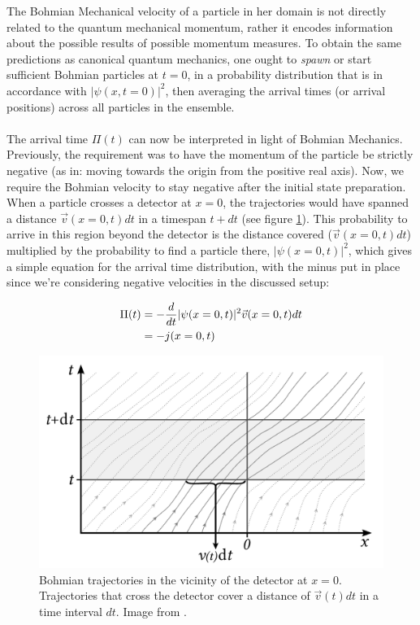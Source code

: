 The Bohmian Mechanical velocity of a particle in her domain is not directly related to the quantum mechanical momentum, rather it encodes information about the possible results of possible momentum measures. To obtain the same predictions as canonical quantum mechanics, one ought to \textit{spawn} or start sufficient Bohmian particles at $t=0$, in a probability distribution that is in accordance with $|\psi(x,t=0)|^2$, then averaging the arrival times (or arrival positions) across all particles in the ensemble.
\\\\
The arrival time $\Pi(t)$ can now be interpreted in light of Bohmian Mechanics. Previously, the requirement was to have the momentum of the particle be strictly negative (as in: moving towards the origin from the positive real axis). Now, we require the Bohmian velocity to stay negative after the initial state preparation. When a particle crosses a detector at $x=0$, the trajectories would have spanned a distance $\vec{v}(x=0,t)dt$ in a timespan $t+dt$ (see figure \ref{fig:probability_current_dt}). This probability to arrive in this region beyond the detector is the distance covered ($\vec{v}(x=0,t)dt$) multiplied by the probability to find a particle there, $|\psi(x=0,t)|^2$, which gives a simple equation for the arrival time distribution, with the minus put in place since we're considering negative velocities in the discussed setup:

\begin{align}
    \Pi(t) &= - \frac{d}{dt} |\psi(x=0,t)|^2 \space \vec{v}(x=0,t) \space dt\\
    &= - j(x=0, t)
\end{align}

\begin{figure}
    \centering
    \includegraphics[width=1\linewidth]{Figures/prob_current_setup.png}
    \caption{Bohmian trajectories in the vicinity of the detector at $x=0$. Trajectories that cross the detector cover a distance of $\vec{v}(t)dt$ in a time interval $dt$. Image from \cite{paper:probability_current}.}
    \label{fig:probability_current_dt}
\end{figure}

